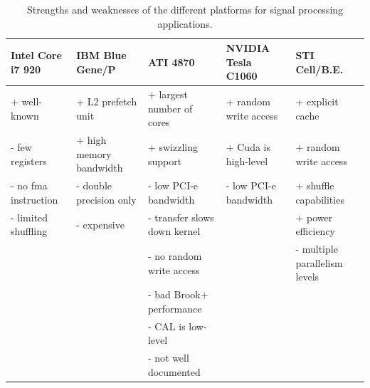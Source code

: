 \documentclass{article}
\begin{document}
\begin{table}[t]
\begin{center}
{\footnotesize
\begin{tabular}{l|l|l|l|l}
Intel Core i7 920            & IBM Blue Gene/P                  & ATI 4870                     & NVIDIA Tesla C1060           & STI  Cell/B.E.                \\
\hline
+ well-known                 & + L2 prefetch unit               & + largest number of cores    & + random write access        & + explicit cache              \\
- few registers              & + high memory bandwidth          & + swizzling support          & + Cuda is high-level         & + random write access         \\
- no fma instruction         & - double precision only          & - low PCI-e bandwidth        & - low PCI-e bandwidth        & + shuffle capabilities        \\
- limited shuffling          & - expensive                      & - transfer slows down kernel &                              & + power efficiency            \\
                             &                                  & - no random write access     &                              & - multiple parallelism levels \\
                             &                                  & - bad Brook+ performance     &                              &                               \\
                             &                                  & - CAL is low-level           &                              &                               \\
                             &                                  & - not well documented        &                              &                               \\
\end{tabular}
} %
\end{center}
\vspace{-0.5cm}
\caption{Strengths and weaknesses of the different platforms for signal processing applications.}
\label{architecture-results-table}
\end{table}
\end{document}
